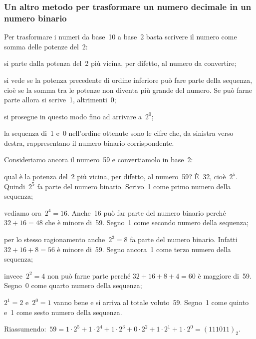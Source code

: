 \subsubsection{Un altro metodo per trasformare un numero decimale in un numero binario}

Per trasformare i numeri da base~10 a base~2 basta scrivere il numero
come somma delle potenze del~2:
\begin{enumeratea}
\item si parte dalla potenza del~2 più vicina, per difetto, al numero da convertire;
\item si vede se la potenza precedente di ordine inferiore può fare parte della sequenza, cioè se la somma tra
le potenze non diventa più grande del numero. Se può farne parte allora si scrive~1, altrimenti~0;
\item si prosegue in questo modo fino ad arrivare a~$2^{0}$;
\item la sequenza di~1 e~0 nell'ordine ottenute sono le cifre che, da sinistra verso destra, rappresentano il numero binario corrispondente.
\end{enumeratea}

\begin{exrig}
\begin{esempio}
Consideriamo ancora il numero~59 e convertiamolo in base~2:
\begin{itemize*}
\item qual è la potenza del~2 più vicina, per difetto, al numero~59? \`E~32, cioè~$2^{5}$. Quindi~$2^{5}$
fa parte del numero binario. Scrivo~1 come primo numero della sequenza;
\item vediamo ora~$2^{4}=16$. Anche~16 può far parte del numero binario perché~$32 + 16 = 48$ che è minore di~59.
Segno~1 come secondo numero della sequenza;
\item per lo stesso ragionamento anche~$2^{3}=8$ fa parte del numero binario.
Infatti~$32 + 16 + 8 = 56$ è minore di~59. Segno ancora~1 come terzo numero della sequenza;
\item invece~$2^{2}=4$ non può farne parte perché $32 + 16 + 8 + 4 = 60$ è maggiore di~59. Segno~0 come quarto numero
della sequenza;
\item $2^{1}=2$ e~$2^{0}=1$ vanno bene e si arriva al totale voluto~59. Segno~1 come quinto e~1 come sesto numero
della sequenza.
\end{itemize*}
Riassumendo:~$59=1\cdot 2^{5}+1\cdot 2^{4}+1\cdot2^{3}+0\cdot 2^{2}+1\cdot 2^{1}+1\cdot2^{0}=(111011)_{2}$.
\end{esempio}
\end{exrig}

